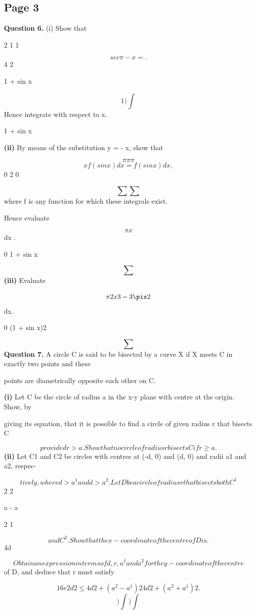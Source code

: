 \documentclass[12pt]{article}
\begin{document}
\subsection*{Page 3}
\begin{flushleft}
\bigskip\textbf{Question 6.} (i) Show that\par
2 1 1\par
\[sec \pi - x = .\]
4 2\par
1 + sin x\par
\[1 ) \int\]
Hence integrate with respect to x.\par
1 + sin x\par
\textbf{(ii)} By means of the substitution y = \pi - x, show that\par
\[\pi \pi \pi\]
\[xf(sin x) dx = f(sin x) dx,\]
0 2 0\par
\[\sum \sum\]
where f is any function for which these integrals exist.\par
Hence evaluate\par
\[\pi x\]
dx .\par
0 1 + sin x\par
\[\sum\]
\textbf{(iii)} Evaluate\par
\[\pi 2x 3 - 3\pix 2\]
dx.\par
0 (1 + sin x)2\par
\[\sum\]
\bigskip\textbf{Question 7.} A circle C is said to be bisected by a curve X if X meets C in exactly two points and these\par
points are diametrically opposite each other on C.\par
\textbf{(i)} Let C be the circle of radius a in the x-y plane with centre at the origin. Show, by\par
giving its equation, that it is possible to find a circle of given radius r that bisects C\par
\[provided r > a. Show that no circle of radius r bisects C if r \geq a .\]
\textbf{(ii)} Let C1 and C2 be circles with centres at (-d, 0) and (d, 0) and radii a1 and a2, respec-\par
\[tively, where d > a^1 and d > a^2. Let D be a circle of radius r that bisects both C^1\]
2 2\par
a - a\par
2 1\par
\[and C^2. Show that the x-coordinate of the centre of D is .\]
4d\par
\[Obtain an expression in terms of d, r, a^1 and a^2 for the y-coordinate of the centre\]
of D, and deduce that r must satisfy\par
\[16r 2 d 2 \leq 4d 2 + (a^2 - a^1) 2 4d 2 + (a^2 + a^1) 2 .\]
\[) \int ) \int\]
\end{flushleft}
\end{document}
